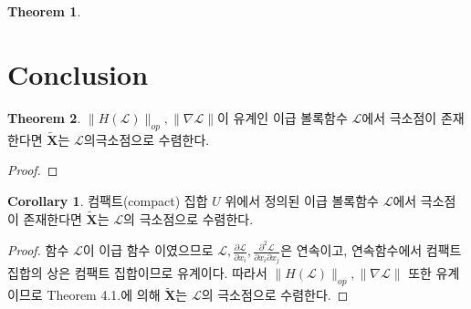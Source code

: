 \documentclass[a4paper,20pt]{article}
\theoremstyle{definition}
\newtheorem{theorem}{Theorem}[section]
\newtheorem{corollary}{Corollary}[theorem]
\newcommand{\curve}[1][X]{\tilde{\mathbf{#1}}}
\begin{document}
\begin{theorem}

\end{theorem}


\section{Conclusion}

\begin{theorem}
$\|H(\mathcal{L})\|_{op}, \|\nabla\mathcal{L}\|$이 유계인 이급 볼록함수 $\mathcal{L}$에서 극소점이 존재한다면 $\curve$는 $\mathcal{L}$의극소점으로 수렴한다.
\end{theorem}
\begin{proof}

\end{proof}
\begin{corollary}
컴팩트(compact) 집합 $U$ 위에서 정의된 이급 볼록함수 $\mathcal{L}$에서 극소점이 존재한다면 $\curve$는 $\mathcal{L}$의 극소점으로 수렴한다.
\end{corollary}
\begin{proof}
함수 $\mathcal{L}$이 이급 함수 이였으므로 $\mathcal{L}, \frac{\partial\mathcal{L}}{\partial x_{i}}, \frac{\partial^{2}\mathcal{L}}{\partial x_{i}\partial x_{j}}$은 연속이고,
연속함수에서 컴팩트 집합의 상은 컴팩트 집합이므로 유계이다. 따라서 $\|H(\mathcal{L})\|_{op}, \|\nabla\mathcal{L}\|$ 또한 유계이므로 Theorem 4.1.에 의해 $\curve$는 $\mathcal{L}$의 극소점으로 수렴한다.
\end{proof}
\end{document}
